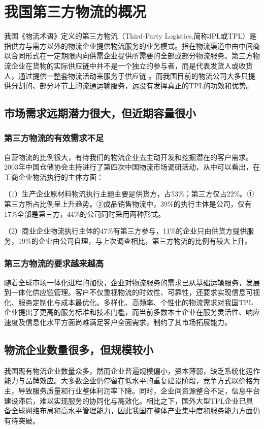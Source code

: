 \documentclass[UTF-8]{CUFEpaper}
\begin{document}
\section{我国第三方物流的概况}
我国《物流术语》定义的第三方物流（Third-Party Logistics,简称3PL或TPL）是指供方与需方以外的物流企业提供物流服务的业务模式。指在物流渠道中由中间商以合同形式在一定期限内向供需企业提供所需要的全部或部分物流服务。第三方物流企业在货物的实际供应链中并不是一个独立的参与者，而是代表发货人或收货人，通过提供一整套物流活动来服务于供应链 。而我国目前的物流公司大多只提供分割的、部分环节上的流通运输服务，远没有发挥真正的TPL的功效和优势。

\subsection{市场需求远期潜力很大，但近期容量很小}
\subsubsection{第三方物流的有效需求不足}

自营物流的比例很大，有待我们的物流企业去主动开发和挖掘潜在的客户需求。2003年中国仓储协会主持进行了第四次中国物流市场调研活动，从中可以看出，在工商企业物流执行的主体方面：

（1）生产企业原材料物流执行主题主要是供货方，占53\%；第三方仅占22\%。①第三方所占比例呈上升趋势。②成品销售物流中，39\%的执行主体是公司，仅有17\%全部是第三方，44\%的公司同时采用两种形式。

（2）商业企业物流执行主体的47\%有第三方参与，11\%的企业只由供货方提供服务，19\%的企业由公司自理，与上次调查相比，第三方物流的比例有较大上升。

\subsubsection{第三方物流的要求越来越高}
随着全球市场一体化进程的加快，企业对物流服务的需求已从基础运输服务，发展到一体化供应链管理。客户不仅重视物流的时效性、可靠性，还要求实现信息可视化、服务定制化与成本最优化。多样化、高频率、个性化的物流需求对我国TPL企业提出了更高的服务标准和技术门槛，而当前多数本土企业在服务灵活性、响应速度及信息化水平方面尚难满足客户全面需求，制约了其市场拓展能力。

\subsection{物流企业数量很多，但规模较小}
我国现有物流企业数量众多，然而企业普遍规模偏小，资本薄弱，缺乏系统化运作能力与品牌效应。大多数企业仍停留在低水平的重复建设阶段，竞争方式以价格为主，导致服务质量和行业整体利润率下降。同时，企业间资源整合不足，信息平台建设滞后，难以实现服务的协同化与高效化。相比之下，国外大型TPL企业已具备全球网络布局和高水平管理能力，因此我国在整体产业集中度和服务能力方面仍有待突破。
\end{document}
